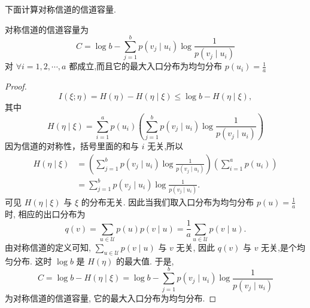 下面计算对称信道的信道容量.
\begin{theorem}
 对称信道的信道容量为
$$
C=\log b-\sum_{j=1}^{b} p\left(v_{j} \mid u_{i}\right) \log \frac{1}{p\left(v_{j} \mid u_{i}\right)}
$$
对 $ \forall i=1,2, \cdots, a $ 都成立,而且它的最大入口分布为均匀分布 $ p\left(u_{i}\right)=\frac{1}{a} $
\end{theorem}
\begin{proof}
    $$
I(\xi ; \eta)=H(\eta)-H(\eta \mid \xi) \leq \log b-H(\eta \mid \xi),
$$
其中
$$
H(\eta \mid \xi)=\sum_{i=1}^{a} p\left(u_{i}\right)\left(\sum_{j=1}^{b} p\left(v_{j} \mid u_{i}\right) \log \frac{1}{p\left(v_{j} \mid u_{i}\right)}\right)
$$
因为信道的对称性，括号里面的和与 $ i $ 无关,所以
$$
\begin{aligned}
H(\eta \mid \xi) & =\left(\sum_{j=1}^{b} p\left(v_{j} \mid u_{i}\right) \log \frac{1}{p\left(v_{j} \mid u_{i}\right)}\right)\left(\sum_{i=1}^{a} p\left(u_{i}\right)\right) \\
& =\sum_{j=1}^{b} p\left(v_{j} \mid u_{i}\right) \log \frac{1}{p\left(v_{j} \mid u_{i}\right)} .
\end{aligned}
$$
可见 $ H(\eta \mid \xi) $ 与 $ \xi $ 的分布无关. 因此当我们取入口分布为均匀分布 $ p(u)=\frac{1}{a} $ 时, 相应的出口分布为
$$
q(v)=\sum_{u \in \mathscr{U}} p(u) p(v \mid u)=\frac{1}{a} \sum_{u \in \mathscr{U}} p(v \mid u) .
$$
由对称信道的定义可知, $ \sum\limits_{u \in \mathscr{U}} p(v \mid u) $ 与 $ v $ 无关, 因此 $ q(v) $ 与 $ v $ 无关,是个均匀分布. 这时 $ \log b $ 是 $ H(\eta) $ 的最大值. 于是,
$$
C=\log b-H(\eta \mid \xi)=\log b-\sum_{j=1}^{b} p\left(v_{j} \mid u_{i}\right) \log \frac{1}{p\left(v_{j} \mid u_{i}\right)}
$$
为对称信道的信道容量, 它的最大入口分布为均匀分布.
\end{proof}

